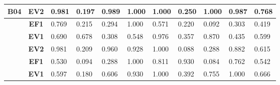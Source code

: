 \begin{table}[htbp]
\begin{tabular}{|cclllllllll|}
		\multicolumn{1}{|c|}{\multirow{-3}{*}{\cellcolor[HTML]{F2F2F2}\textbf{B04}}} & \multicolumn{1}{c|}{\textbf{EV2}} & \multicolumn{1}{l|}{0.981} & \multicolumn{1}{l|}{0.197} & \multicolumn{1}{l|}{0.989} & \multicolumn{1}{l|}{1.000} & \multicolumn{1}{l|}{1.000} & \multicolumn{1}{l|}{0.250} & \multicolumn{1}{l|}{1.000} & \multicolumn{1}{l|}{0.987} & 0.768 \\ \hline
		\rowcolor[HTML]{F2F2F2} 
		\multicolumn{1}{|c|}{\cellcolor[HTML]{F2F2F2}} & \multicolumn{1}{c|}{\cellcolor[HTML]{F2F2F2}\textbf{EF1}} & \multicolumn{1}{l|}{\cellcolor[HTML]{F2F2F2}0.769} & \multicolumn{1}{l|}{\cellcolor[HTML]{F2F2F2}0.215} & \multicolumn{1}{l|}{\cellcolor[HTML]{F2F2F2}0.294} & \multicolumn{1}{l|}{\cellcolor[HTML]{F2F2F2}1.000} & \multicolumn{1}{l|}{\cellcolor[HTML]{F2F2F2}0.571} & \multicolumn{1}{l|}{\cellcolor[HTML]{F2F2F2}0.220} & \multicolumn{1}{l|}{\cellcolor[HTML]{F2F2F2}0.092} & \multicolumn{1}{l|}{\cellcolor[HTML]{F2F2F2}0.303} & 0.419 \\ \cline{2-11} 
		\multicolumn{1}{|c|}{\cellcolor[HTML]{F2F2F2}} & \multicolumn{1}{c|}{\textbf{EV1}} & \multicolumn{1}{l|}{0.690} & \multicolumn{1}{l|}{0.678} & \multicolumn{1}{l|}{0.308} & \multicolumn{1}{l|}{0.548} & \multicolumn{1}{l|}{0.976} & \multicolumn{1}{l|}{0.357} & \multicolumn{1}{l|}{0.870} & \multicolumn{1}{l|}{0.435} & 0.599 \\ \cline{2-11} 
		\rowcolor[HTML]{F2F2F2} 
		\multicolumn{1}{|c|}{\multirow{-3}{*}{\cellcolor[HTML]{F2F2F2}\textbf{B05}}} & \multicolumn{1}{c|}{\cellcolor[HTML]{F2F2F2}\textbf{EV2}} & \multicolumn{1}{l|}{\cellcolor[HTML]{F2F2F2}0.981} & \multicolumn{1}{l|}{\cellcolor[HTML]{F2F2F2}0.209} & \multicolumn{1}{l|}{\cellcolor[HTML]{F2F2F2}0.960} & \multicolumn{1}{l|}{\cellcolor[HTML]{F2F2F2}0.928} & \multicolumn{1}{l|}{\cellcolor[HTML]{F2F2F2}1.000} & \multicolumn{1}{l|}{\cellcolor[HTML]{F2F2F2}0.088} & \multicolumn{1}{l|}{\cellcolor[HTML]{F2F2F2}0.288} & \multicolumn{1}{l|}{\cellcolor[HTML]{F2F2F2}0.882} & 0.615 \\ \hline
		\multicolumn{1}{|c|}{\cellcolor[HTML]{F2F2F2}} & \multicolumn{1}{c|}{\textbf{EF1}} & \multicolumn{1}{l|}{0.530} & \multicolumn{1}{l|}{0.094} & \multicolumn{1}{l|}{0.288} & \multicolumn{1}{l|}{1.000} & \multicolumn{1}{l|}{0.811} & \multicolumn{1}{l|}{0.930} & \multicolumn{1}{l|}{0.084} & \multicolumn{1}{l|}{0.762} & 0.542 \\ \cline{2-11} 
		\rowcolor[HTML]{F2F2F2} 
		\multicolumn{1}{|c|}{\cellcolor[HTML]{F2F2F2}} & \multicolumn{1}{c|}{\cellcolor[HTML]{F2F2F2}\textbf{EV1}} & \multicolumn{1}{l|}{\cellcolor[HTML]{F2F2F2}0.597} & \multicolumn{1}{l|}{\cellcolor[HTML]{F2F2F2}0.180} & \multicolumn{1}{l|}{\cellcolor[HTML]{F2F2F2}0.606} & \multicolumn{1}{l|}{\cellcolor[HTML]{F2F2F2}0.930} & \multicolumn{1}{l|}{\cellcolor[HTML]{F2F2F2}1.000} & \multicolumn{1}{l|}{\cellcolor[HTML]{F2F2F2}0.392} & \multicolumn{1}{l|}{\cellcolor[HTML]{F2F2F2}0.755} & \multicolumn{1}{l|}{\cellcolor[HTML]{F2F2F2}1.000} & 0.666 \\ \cline{2-11} 

\end{tabular}
\end{table}
